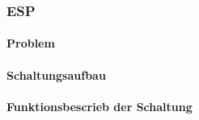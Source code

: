 \subsubsection{ESP}
\label{subsubsec:Inbetriebnahme_ESP}

\paragraph{Problem}

\paragraph{Schaltungsaufbau}

\paragraph{Funktionsbescrieb der Schaltung}